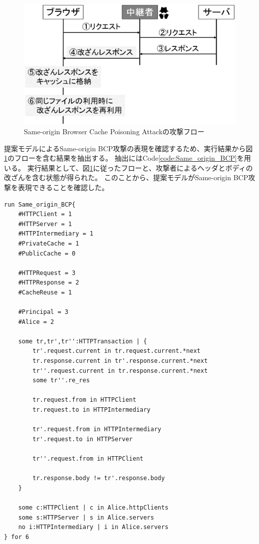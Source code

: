 \documentclass[12pt,a4paper]{jbook}
\begin{document}
\begin{figure}[htb]
\centering
\includegraphics[width=400pt]{./fig/SameBCP_flow.eps}
\caption{Same-origin Browser Cache Poisoning Attackの攻撃フロー}
\label{fig:SameBCP_flow}
\end{figure}

提案モデルによるSame-origin BCP攻撃の表現を確認するため、実行結果から図\ref{fig:SameBCP_flow}のフローを含む結果を抽出する。
抽出にはCode\ref{code:Same_origin_BCP}を用いる。
実行結果として、図\ref{fig:SameBCP_flow}に従ったフローと、攻撃者によるヘッダとボディの改ざんを含む状態が得られた。
このことから、提案モデルがSame-origin BCP攻撃を表現できることを確認した。

\begin{lstlisting}[caption=Same-origin BCP攻撃の表現, label=code:Same_origin_BCP]
run Same_origin_BCP{
	#HTTPClient = 1
	#HTTPServer = 1
	#HTTPIntermediary = 1
	#PrivateCache = 1
	#PublicCache = 0

	#HTTPRequest = 3
	#HTTPResponse = 2
	#CacheReuse = 1

	#Principal = 3
	#Alice = 2

	some tr,tr',tr'':HTTPTransaction | {
		tr'.request.current in tr.request.current.*next
		tr.response.current in tr'.response.current.*next
		tr''.request.current in tr.response.current.*next
		some tr''.re_res

		tr.request.from in HTTPClient
		tr.request.to in HTTPIntermediary

		tr'.request.from in HTTPIntermediary
		tr'.request.to in HTTPServer

		tr''.request.from in HTTPClient

		tr.response.body != tr'.response.body
	}

	some c:HTTPClient | c in Alice.httpClients
	some s:HTTPServer | s in Alice.servers
	no i:HTTPIntermediary | i in Alice.servers
} for 6
\end{lstlisting}
\end{document}
